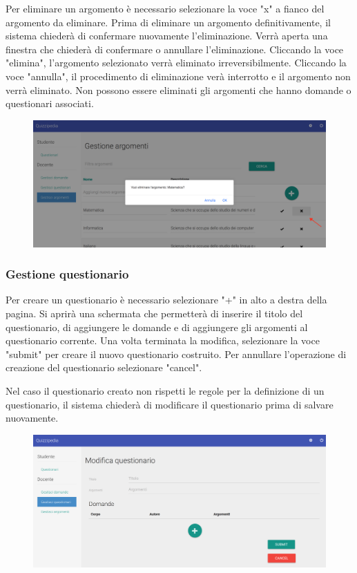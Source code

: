 \documentclass[12pt,a4paper]{article}
\begin{document}
		Per eliminare un argomento è necessario selezionare la voce "x" a fianco del argomento da eliminare. Prima di eliminare un argomento definitivamente, il sistema chiederà di confermare nuovamente l'eliminazione.
		Verrà aperta una finestra che chiederà di confermare o annullare l'eliminazione. Cliccando la voce "elimina", l'argomento selezionato verrà eliminato irreversibilmente. Cliccando la voce "annulla", il procedimento di eliminazione verà interrotto e il argomento non verrà eliminato.
		Non possono essere eliminati gli argomenti che hanno domande o questionari associati.
		
			\begin{figure}[H]	
				\centering
				\includegraphics[width=1.0\linewidth]{../img/screenshot/eliminaArgomento.png}
				\caption{}
				\label{Elimina argomento}
			\end{figure}
		
		\subsubsection{Gestione questionario}
		Per creare un questionario è necessario selezionare "+" in alto a destra della pagina. Si aprirà una schermata che permetterà di inserire il titolo del questionario, di aggiungere le domande e di aggiungere gli argomenti al questionario corrente.
		Una volta terminata la modifica, selezionare la voce "submit" per creare il nuovo questionario costruito. 
		Per annullare l'operazione di creazione del questionario selezionare "cancel".
		
		Nel caso il questionario creato non rispetti le regole per la definizione di un questionario, il sistema chiederà di modificare il questionario prima di salvare nuovamente.
		
		\begin{figure}[H]	
			\centering
			\includegraphics[width=1.0\linewidth]{../img/screenshot/creazioneQuestionario.png}
			\caption{}
			\label{Creazione questionario}
		\end{figure}
		
\end{document}
